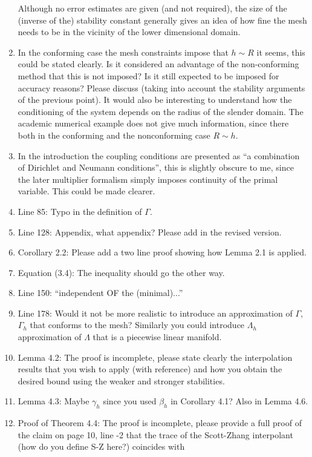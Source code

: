 \documentclass{article}
\begin{document}
\begin{enumerate}
Although no error estimates are given (and not required), the size of
the (inverse of the) stability constant generally gives an idea of how fine the
mesh needs to be in the vicinity of the lower dimensional domain. 
\item In the conforming case the mesh constraints impose that $h \sim R$
  it seems, this could be stated clearly. Is it considered an
  advantage of the non-conforming method that this is not imposed?
Is it still expected to be imposed for accuracy reasons? Please
discuss (taking into account the stability arguments of the previous
point). It would also be interesting to understand how the
conditioning of the system depends on the radius of the slender
domain. The academic numerical example does not give much information,
since there both in the conforming and the nonconforming case $R  \sim h$.
\item In the introduction the coupling conditions are presented as ``a
  combination of Dirichlet and Neumann conditions'', this is slightly
  obscure to me, since the later multiplier formalism simply imposes
  continuity of the primal variable. This could be made clearer.
\item Line 85: Typo in the definition of $\Gamma$.
\item Line 128: Appendix, what appendix? Please add in the revised version.
\item Corollary 2.2: Please add a two line proof showing how Lemma 2.1
  is applied.
\item Equation (3.4): The inequality should go the other way.
\item Line 150: ``independent OF the (minimal)...''
\item Line 178: Would it not be more realistic to introduce an
  approximation of $\Gamma$, $\Gamma_h$ that conforms to the mesh?
  Similarly you could introduce $\Lambda_h$ approximation of $\Lambda$
  that is a piecewise linear manifold.
\item Lemma 4.2: The proof is incomplete, please state clearly the
  interpolation results that you wish to apply (with reference) and
  how you obtain the desired bound using the weaker and stronger
  stabilities.
\item Lemma 4.3: Maybe $\gamma_h$ since you used $\beta_h$ in
  Corollary 4.1? Also in Lemma 4.6.
\item Proof of Theorem 4.4: The proof is incomplete, please provide a
  full proof of the claim on page 10, line -2 that the trace of the
  Scott-Zhang interpolant (how do you define S-Z here?) coincides with

\end{enumerate}
\end{document}
